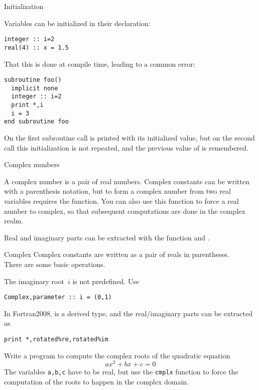  {Initialization}

Variables can be initialized in their declaration:
\begin{lstlisting}
integer :: i=2
real(4) :: x = 1.5
\end{lstlisting}

That this is done at compile time, leading to a common error:
\begin{lstlisting}
subroutine foo()
  implicit none
  integer :: i=2
  print *,i
  i = 3
end subroutine foo
\end{lstlisting}
On the first subroutine call  is printed with its initialized
value, but on the second call this initialization is not repeated, and
the previous value of  is remembered.

 {Complex numbers}
\label{sec:fcomplex}

A complex number is a pair of real numbers.
Complex constants can be written with a parenthesis notation,
but to form a complex number from two real variables requires
the  function.
You can also use this function to force a real number
to complex, so that subsequent computations are done
in the complex realm.

Real and imaginary parts can be extracted with the function
 and .

\begin{block}{Complex}
  \label{sl:fcomplex}
  Complex constants are written as a pair of reals in parentheses.\\
  There are some basic operations.
\end{block}

The imaginary root~$i$ is not predefined. Use
\begin{lstlisting}
Complex,parameter :: i = (0,1)
\end{lstlisting}

In Fortran2008,  is a derived type,
and the real/imaginary parts can be extracted as
\begin{lstlisting}
print *,rotated%re,rotated%im
\end{lstlisting}

\begin{exercise}
  Write a program to compute the complex roots of the quadratic
  equation \[ ax^2+bx+c=0 \]
  The variables \lstinline+a,b,c+ have to be real,
  but use the \lstinline+cmplx+ function to force the computation
  of the roots to happen in the complex domain.
\end{exercise}

